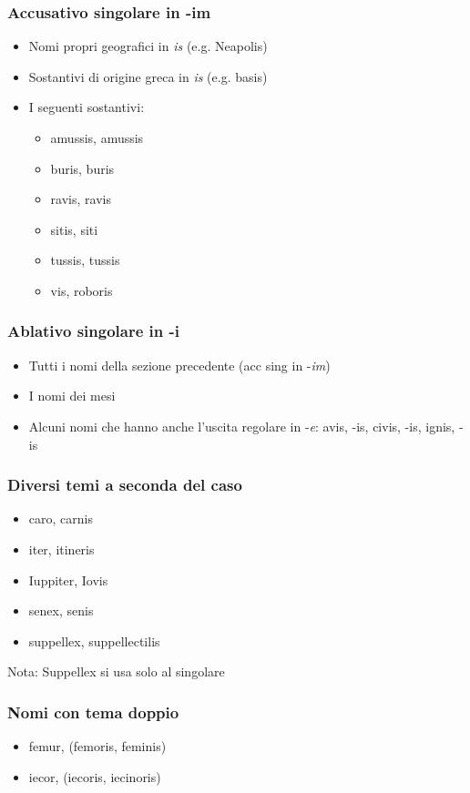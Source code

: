 \subsubsection*{Accusativo singolare in -im}
\begin{itemize}
    \item Nomi propri geografici in \textit{is} (e.g. Neapolis)
    \item Sostantivi di origine greca in \textit{is} (e.g. basis)
    \item I seguenti sostantivi:
    \begin{itemize}
        \item amussis, amussis
        \item buris, buris
        \item ravis, ravis
        \item sitis, siti
        \item tussis, tussis
        \item vis, roboris
    \end{itemize}
\end{itemize}

\subsubsection*{Ablativo singolare in -i}
\begin{itemize}
    \item Tutti i nomi della sezione precedente (acc sing in -\textit{im})
    \item I nomi dei mesi
    \item Alcuni nomi che hanno anche l'uscita regolare in -\textit{e}: avis, -is, civis, -is, ignis, -is
\end{itemize}

\subsubsection*{Diversi temi a seconda del caso}
\begin{itemize}
    \item caro, carnis
    \item iter, itineris
    \item Iuppiter, Iovis
    \item senex, senis
    \item suppellex, suppellectilis
\end{itemize}
Nota: Suppellex si usa solo al singolare

\subsubsection*{Nomi con tema doppio}
\begin{itemize}
    \item femur, (femoris, feminis)
    \item iecor, (iecoris, iecinoris)
\end{itemize}


